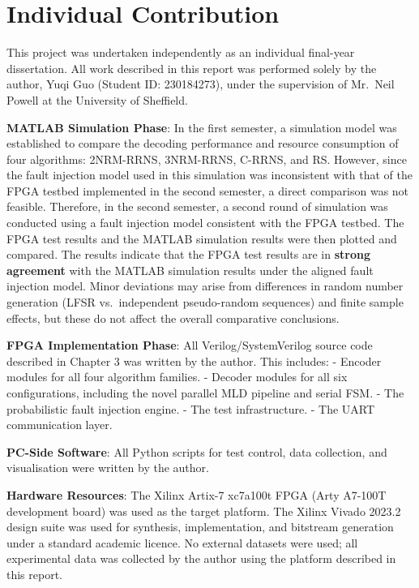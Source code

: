 \documentclass[
  12pt,
  a4paper]{report}
\begin{document}
\chapter{Individual Contribution}\label{individual-contribution}

This project was undertaken independently as an individual final-year
dissertation. All work described in this report was performed solely by
the author, Yuqi Guo (Student ID: 230184273), under the supervision of
Mr.~Neil Powell at the University of Sheffield.

\textbf{MATLAB Simulation Phase}: In the first semester, a simulation
model was established to compare the decoding performance and resource
consumption of four algorithms: 2NRM-RRNS, 3NRM-RRNS, C-RRNS, and RS.
However, since the fault injection model used in this simulation was
inconsistent with that of the FPGA testbed implemented in the second
semester, a direct comparison was not feasible. Therefore, in the second
semester, a second round of simulation was conducted using a fault
injection model consistent with the FPGA testbed. The FPGA test results
and the MATLAB simulation results were then plotted and compared. The
results indicate that the FPGA test results are in \textbf{strong
agreement} with the MATLAB simulation results under the aligned fault
injection model. Minor deviations may arise from differences in random
number generation (LFSR vs.~independent pseudo-random sequences) and
finite sample effects, but these do not affect the overall comparative
conclusions.

\textbf{FPGA Implementation Phase}: All Verilog/SystemVerilog source
code described in Chapter 3 was written by the author. This includes: -
Encoder modules for all four algorithm families. - Decoder modules for
all six configurations, including the novel parallel MLD pipeline and
serial FSM. - The probabilistic fault injection engine. - The test
infrastructure. - The UART communication layer.

\textbf{PC-Side Software}: All Python scripts for test control, data
collection, and visualisation were written by the author.

\textbf{Hardware Resources}: The Xilinx Artix-7 xc7a100t FPGA (Arty
A7-100T development board) was used as the target platform. The Xilinx
Vivado 2023.2 design suite was used for synthesis, implementation, and
bitstream generation under a standard academic licence. No external
datasets were used; all experimental data was collected by the author
using the platform described in this report.
\end{document}
